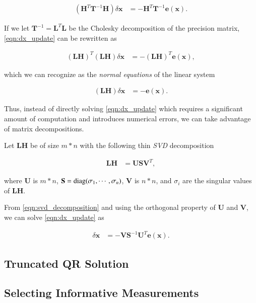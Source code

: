 \begin{equation}\label{eqn:dx_update}
  \begin{aligned}
  (\mathbf{H}^{T}\mathbf{T}^{-1}\mathbf{H})\delta\mathbf{x} &=
    -\mathbf{H}^{T}\mathbf{T}^{-1}\mathbf{e}(\mathbf{x}).
  \end{aligned}
\end{equation}

If we let $\mathbf{T}^{-1}=\mathbf{L}^{T}\mathbf{L}$ be the Cholesky
decomposition of the precision matrix, \eqref{eqn:dx_update} can be rewritten as

\begin{equation}\label{eqn:dx_update_normal}
  \begin{aligned}
  (\mathbf{L}\mathbf{H})^{T}(\mathbf{L}\mathbf{H})\delta\mathbf{x} &= 
    -(\mathbf{L}\mathbf{H})^{T}\mathbf{e}(\mathbf{x}),
  \end{aligned}
\end{equation}

which we can recognize as the \emph{normal equations} of the linear system

\begin{equation}\label{eqn:dx_update_standard}
  \begin{aligned}
  (\mathbf{L}\mathbf{H})\delta\mathbf{x} &= -\mathbf{e}(\mathbf{x}).
  \end{aligned}
\end{equation}

Thus, instead of directly solving \eqref{eqn:dx_update} which requires a
significant amount of computation and introduces numerical errors, we can take
advantage of matrix decompositions.

Let $\mathbf{L}\mathbf{H}$ be of size $m*n$ with the following thin \emph{SVD}
decomposition

\begin{equation}\label{eqn:svd_decomposition}
  \begin{aligned}
  \mathbf{L}\mathbf{H} &= \mathbf{U}\mathbf{S}\mathbf{V}^{T},
  \end{aligned}
\end{equation}

where $\mathbf{U}$ is $m*n$, $\mathbf{S}=\operatorname{diag}(\sigma_1, \cdots, \sigma_n)$,
$\mathbf{V}$ is $n*n$, and $\sigma_i$ are the singular values of
$\mathbf{L}\mathbf{H}$.

From \eqref{eqn:svd_decomposition} and using the orthogonal property of
$\mathbf{U}$ and $\mathbf{V}$, we can solve \eqref{eqn:dx_update} as

\begin{equation}\label{eqn:dx_svd_solve}
  \begin{aligned}
  \delta\mathbf{x} &= -\mathbf{V}\mathbf{S}^{-1}\mathbf{U}^{T}
    \mathbf{e}(\mathbf{x}).
  \end{aligned}
\end{equation}

\subsection{Truncated QR Solution}

\subsection{Selecting Informative Measurements}


